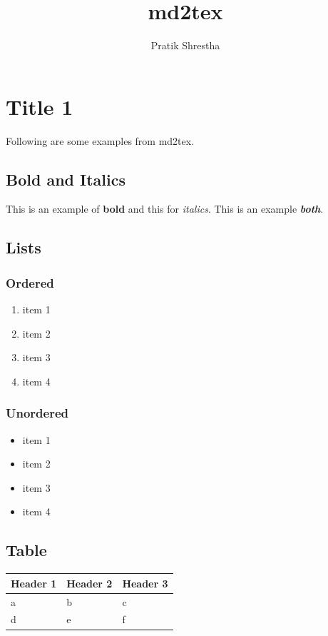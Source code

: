\documentclass[11pt]{article}
\begin{document}
\title{\textbf{ md2tex }}
\author{ Pratik Shrestha }
\maketitle

\section{Title 1}

Following are some examples from md2tex.

\subsection{Bold and Italics}

This is an example of \textbf{bold} and this for \textit{italics}. This is an example \textbf{\textit{both}}.

\subsection{Lists}

\subsubsection{Ordered}
\begin{enumerate}
    \item item 1
    \item item 2
    \item item 3
    \item item 4
\end{enumerate}

\subsubsection{Unordered}
\begin{itemize}
    \item item 1
    \item item 2
    \item item 3
    \item item 4
\end{itemize}

\subsection{Table}

\begin{tabular}{|l|l|l|}
\hline
Header 1&Header 2&Header 3 \\
\hline
a&b&c \\
d&e&f \\
\hline
\end{tabular}
\end{document}
